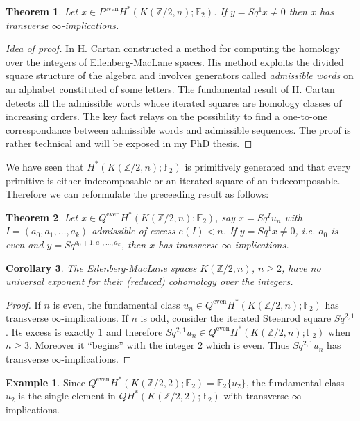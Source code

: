 \documentclass[11pt,a4paper]{amsart}
\theoremstyle{plain}
\newtheorem{thm}{Theorem}[section]
\newtheorem{cor}[thm]{Corollary}
\theoremstyle{definition}
\newtheorem{exmp}{Example}[section]
\theoremstyle{remark}
\newcommand{\Z}{\mathbb{Z}}
\newcommand{\F}{\mathbb{F}}
\renewcommand{\geq}{\geqslant}
\begin{document}
\begin{thm}\label{t:extension}
Let $x\in P^\text{even}H^*(K(\Z/2,n);\F_2)$. If $y=Sq^1x\not=0$ then $x$ has transverse $\infty$-implications.
\end{thm}

\begin{proof}[Idea of proof]
In \cite{Ca-55} H. Cartan constructed a method for computing the homology over the integers of Eilenberg-MacLane spaces. His method exploits the divided square structure of the algebra and involves generators called {\it admissible words} on an alphabet constituted of some letters. The fundamental result of H. Cartan detects all the admissible words whose iterated squares are homology classes of increasing orders. The key fact relays on the possibility to find a one-to-one correspondance between admissible words and admissible sequences. The proof is rather technical and will be exposed in my PhD thesis.
\end{proof}

We have seen that $H^*(K(\Z/2,n);\F_2)$ is primitively generated and that every primitive is either indecomposable or an iterated square of an indecomposable. Therefore we can reformulate the preceeding result as follows:

\begin{thm}\label{t:extension2}
Let $x\in Q^\text{even}H^*(K(\Z/2,n);\F_2)$, say $x=Sq^I u_n$ with $I=(a_0,a_1,\dots,a_k)$ admissible of excess $e(I)<n$. If $y=Sq^1x\not=0$, i.e. $a_0$ is even and $y=Sq^{a_0+1,a_1,\dots,a_k}$, then $x$ has transverse $\infty$-implications.
\end{thm}

\begin{cor}
The Eilenberg-MacLane spaces $K(\Z/2,n)$, $n\geq2$, have no universal exponent for their (reduced) cohomology over the integers.
\end{cor}

\begin{proof}
If $n$ is even, the fundamental class $u_n\in Q^\text{even}H^*(K(\Z/2,n);\F_2)$ has transverse $\infty$-implications. If $n$ is odd, consider the iterated Steenrod square $Sq^{2,1}$. Its excess is exactly $1$ and therefore $Sq^{2,1}u_n\in Q^\text{even}H^*(K(\Z/2,n);\F_2)$ when $n\geq3$. Moreover it ``begins'' with the integer $2$ which is even. Thus  $Sq^{2,1}u_n$ has transverse $\infty$-implications.
\end{proof}

\begin{exmp}
Since $Q^\text{even}H^*(K(\Z/2,2);\F_2)=\F_2\{u_2\}$, the fundamental class $u_2$ is the single element in $QH^*(K(\Z/2,2);\F_2)$ with transverse $\infty$-implications.
\end{exmp}
\end{document}
